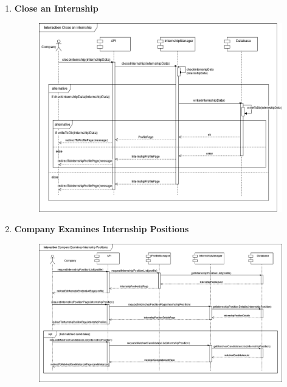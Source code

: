 \begin{enumerate}
    \newpage
    \item \textbf{Close an Internship}
    \begin{figure}[h!]
            \centering  \includegraphics[width=1\textwidth]{DD/Images/Interactions/INT10_CloseInternship.drawio.png}
            \label{fig:ComponentViewDiagram}
    \end{figure}

    \newpage
    \item \textbf{Company Examines Internship Positions}
    \begin{figure}[h!]
            \centering  \includegraphics[width=1\textwidth]{DD/Images/Interactions/INT11_CompanyExaminesInternshipPosition.drawio.png}
            \label{fig:ComponentViewDiagram}
    \end{figure}


\end{enumerate}
